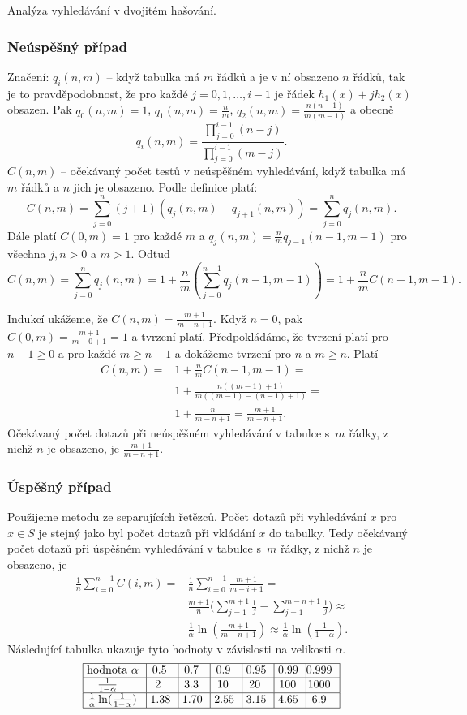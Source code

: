 \documentclass[a4paper,12pt]{article}
\begin{document}
Analýza vyhledávání v dvojitém hašování.

\subsubsection{Neúspěšný případ}

 

Značení:  $q_i(n,m)$ -- když tabulka má $m$ řádků a 
je v ní obsazeno $n$ řádků, tak je to 
pravděpodobnost, že pro každé $j=0,1,\dots,i-1$ je 
řádek $h_1(x)+jh_2(x)$ obsazen. Pak $q_0(n,m)=1$, $q_1(n,m)=\frac 
nm$, 
$q_2(n,m)=\frac {n(n-1)}{m(m-1)}$ a obecně 
$$q_i(n,m)=\frac {\prod_{j=0}^{i-1}(n-j)}{\prod_{j=0}^{i-1}(m-j)}
.$$
$C(n,m)$ -- očekávaný počet testů v neúspěšném 
vyhledávání, když tabulka má $m$ řádků a $
n$ jich 
je obsazeno. Podle definice platí:
$$C(n,m)=\sum_{j=0}^n(j+1)(q_j(n,m)-q_{j+1}(n,m))=\sum_{j=0}^nq_j
(n,m).$$
Dále platí $C(0,m)=1$ pro každé $m$ a 
$q_j(n,m)=\frac nmq_{j-1}(n-1,m-1)$ pro všechna $j,n>0$ a $m>1$. 
Odtud
$$C(n,m)=\sum_{j=0}^nq_j(n,m)=1+\frac nm(\sum_{j=0}^{n-1}q_j(n-1,
m-1))=1+\frac nmC(n-1,m-1).$$

Indukcí ukážeme, že $C(n,m)=\frac {m+1}{m-n
+1}$. Když $n=0$, pak 
$C(0,m)=\frac {m+1}{m-0+1}=1$ a tvrzení platí. Předpokládáme, že tvrzení 
platí pro $n-1\ge 0$ a pro každé $m\ge n-1$ a dokážeme tvrzení 
pro $n$ a $m\ge n$. Platí
\begin{align*} C(n,m)=&1+\frac nmC(n-1,m-1)=\\
&1+\frac {n((m-1)+1)}{m((m-1)-(n-1)+1)}=\\
&1+\frac n{m-n+1}=\frac {m+1}{m-n+1}.\end{align*}
Očekávaný počet dotazů při neúspěšném 
vyhledávání v tabulce s~$m$ řádky, z nichž $n$ je obsazeno, 
je $\frac {m+1}{m-n+1}$.

\subsubsection{Úspěšný případ}

 

Použijeme metodu ze separujících řetězců. 
Počet dotazů při vyhledávání $x$ pro $x\in 
S$ je 
stejný jako byl počet dotazů při vkládání $
x$ do 
tabulky. Tedy očekávaný počet dotazů při 
úspěšném vyhledávání v tabulce s~$m$ řádky, z nichž $
n$ je 
obsazeno, je
\begin{align*}\frac 1n\sum_{i=0}^{n-1}C(i,m)=&\frac 1n\sum_{i=0}^{n-1}\frac {
m+1}{m-i+1}=\\
&\frac {m+1}n\big(\sum_{j=1}^{m+1}\frac 1j-\sum_{j=1}^{m-n+1}\frac 
1j\big)\approx\\
&\frac 1{\alpha}\ln(\frac {m+1}{m-n+1})\approx\frac 1{\alpha}\ln(\frac 
1{1-\alpha}).\end{align*}
Následující tabulka ukazuje tyto hodnoty v závislosti na 
velikosti $\alpha$. 
$$\vtop{\offinterlineskip\halign {\strut\vrule\ # & \vrule\ # & \vrule\ # & \vrule\ # & \vrule\ # & \vrule\ # & \vrule \hfil # \hfil \vrule\cr\noalign{\hrule}hodnota $\alpha$ & 0.5 & 0.7 & 0.9 & 0.95 & 0.99 & 0.999 \hfill \cr\noalign{\hrule}$\frac 1{1-\alpha}$ & 2 & 3.3 & 10 & 20 & 100 & 1000 \cr\noalign{\hrule} $\frac 1{\alpha}\ln(\frac 1{1-\alpha})$ & 1.38 & 1.70 & 2.55 & 3.15 & 4.65 & 6.9 \cr\noalign{\hrule}}}$$
\end{document}
